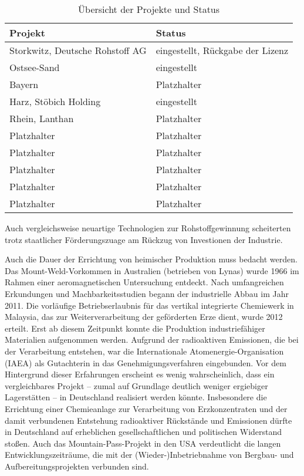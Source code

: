 \documentclass[12pt,a4paper,oneside]{book} %
\begin{document}
\begin{table}[ht]
	\centering
	\begin{tabular}{p{6cm} p{6cm}}
		\toprule
		\textbf{Projekt} & \textbf{Status} \\
		\midrule
		Storkwitz, Deutsche Rohstoff AG & eingestellt, Rückgabe der Lizenz \\
		Ostsee-Sand & eingestellt \\
		Bayern & Platzhalter \\
		Harz, Stöbich Holding & eingestellt \\
		Rhein, Lanthan & Platzhalter \\
		Platzhalter & Platzhalter \\
		Platzhalter & Platzhalter \\
		Platzhalter & Platzhalter \\
		Platzhalter & Platzhalter \\
		Platzhalter & Platzhalter \\
		\bottomrule
	\end{tabular}
	\caption{Übersicht der Projekte und Status}
	\label{tab:projekt_status}
\end{table}

Auch vergleichsweise neuartige Technologien zur Rohstoffgewinnung scheiterten trotz staatlicher Förderungszuage am Rückzug von Investionen der Industrie.

Auch die Dauer der Errichtung von heimischer Produktion muss bedacht werden. Das Mount-Weld-Vorkommen in Australien (betrieben von Lynas) wurde 1966 im Rahmen einer aeromagnetischen Untersuchung entdeckt. Nach umfangreichen Erkundungen und Machbarkeitsstudien begann der industrielle Abbau im Jahr 2011. Die vorläufige Betriebserlaubnis für das vertikal integrierte Chemiewerk in Malaysia, das zur Weiterverarbeitung der geförderten Erze dient, wurde 2012 erteilt. Erst ab diesem Zeitpunkt konnte die Produktion industriefähiger Materialien aufgenommen werden. Aufgrund der radioaktiven Emissionen, die bei der Verarbeitung entstehen, war die Internationale Atomenergie-Organisation (IAEA) als Gutachterin in das Genehmigungsverfahren eingebunden. Vor dem Hintergrund dieser Erfahrungen erscheint es wenig wahrscheinlich, dass ein vergleichbares Projekt – zumal auf Grundlage deutlich weniger ergiebiger Lagerstätten – in Deutschland realisiert werden könnte. Insbesondere die Errichtung einer Chemieanlage zur Verarbeitung von Erzkonzentraten und der damit verbundenen Entstehung radioaktiver Rückstände und Emissionen dürfte in Deutschland auf erheblichen gesellschaftlichen und politischen Widerstand stoßen. Auch das Mountain-Pass-Projekt in den USA verdeutlicht die langen Entwicklungszeiträume, die mit der (Wieder-)Inbetriebnahme von Bergbau- und Aufbereitungsprojekten verbunden sind.
\end{document}
